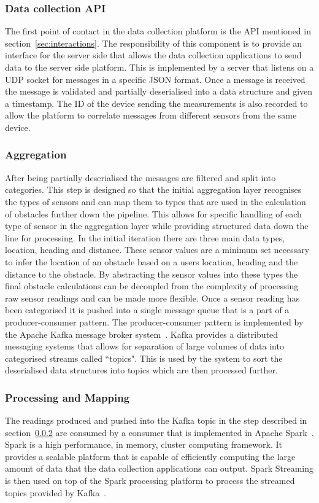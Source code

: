 \documentclass[prodmode,acmtosem]{acmsmall} %
\begin{document}
\subsubsection{Data collection API}
The first point of contact in the data collection platform is the API mentioned in section~\ref{sec:interactions}. The responsibility of this component is to provide an interface for the server side that allows the data collection applications to send data to the server side platform. This is implemented by a server that listens on a UDP socket for messages in a specific JSON format. Once a message is received the message is validated and partially deserialised into a data structure and given a timestamp. The ID of the device sending the measurements is also recorded to allow the platform to correlate messages from different sensors from the same device.

\subsubsection{Aggregation}
\label{sec:aggregation}
After being partially deserialised the messages are filtered and split into categories. This step is designed so that the initial aggregation layer recognises the types of sensors and can map them to types that are used in the calculation of obstacles further down the pipeline. This allows for specific handling of each type of sensor in the aggregation layer while providing structured data down the line for processing. In the initial iteration there are three main data types, location, heading and distance. These sensor values are a minimum set necessary to infer the location of an obstacle based on a users location, heading and the distance to the obstacle. By abstracting the sensor values into these types the final obstacle calculations can be decoupled from the complexity of processing raw sensor readings and can be made more flexible. Once a sensor reading has been categorised it is pushed into a single message queue that is a part of a producer-consumer pattern. The producer-consumer pattern is implemented by the Apache Kafka message broker system~\cite{ApacheKafka}. Kafka provides a distributed messaging systems that allows for separation of large volumes of data into categorised streams called ``topics". This is used by the system to sort the deserialised data structures into topics which are then processed further.

\subsubsection{Processing and Mapping}
The readings produced and pushed into the Kafka topic in the step described in section~\ref{sec:aggregation} are consumed by a consumer that is implemented in Apache Spark~\cite{ApacheSpark}. Spark is a high performance, in memory, cluster computing framework. It provides a scalable platform that is capable of efficiently computing the large amount of data that the data collection applications can output. Spark Streaming is then used on top of the Spark processing platform to process the streamed topics provided by Kafka~\cite{ApacheSparkStreaming}.
\end{document}
